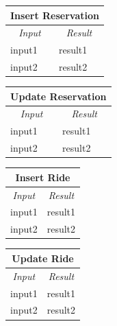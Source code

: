 \documentclass[english]{article}
\begin{document}
\begin{center}
	\begin{tabular}{ | m{6cm} | m{6cm} | }
		\hline 
		\multicolumn{2}{|c|}{\textbf{Insert Reservation}} \\
		\hline
		\multicolumn{1}{|c|}{\textit{Input}} & \multicolumn{1}{c|}{\textit{Result}} \\
		\hline
		input1 & result1 \\
		\hline
		input2 & result2 \\
		\hline
	\end{tabular}
\end{center}

\begin{center}
	\begin{tabular}{ | m{6cm} | m{6cm} | }
		\hline 
		\multicolumn{2}{|c|}{\textbf{Update Reservation}} \\
		\hline
		\multicolumn{1}{|c|}{\textit{Input}} & \multicolumn{1}{c|}{\textit{Result}} \\
		\hline
		input1 & result1 \\
		\hline
		input2 & result2 \\
		\hline
	\end{tabular}
\end{center}

\begin{center}
	\begin{tabular}{ | m{6cm} | m{6cm} | }
		\hline 
		\multicolumn{2}{|c|}{\textbf{Insert Ride}} \\
		\hline
		\multicolumn{1}{|c|}{\textit{Input}} & \multicolumn{1}{c|}{\textit{Result}} \\
		\hline
		input1 & result1 \\
		\hline
		input2 & result2 \\
		\hline
	\end{tabular}
\end{center}


\begin{center}
	\begin{tabular}{ | m{6cm} | m{6cm} | }
		\hline 
		\multicolumn{2}{|c|}{\textbf{Update Ride}} \\
		\hline
		\multicolumn{1}{|c|}{\textit{Input}} & \multicolumn{1}{c|}{\textit{Result}} \\
		\hline
		input1 & result1 \\
		\hline
		input2 & result2 \\
		\hline
	\end{tabular}
\end{center}
\end{document}
